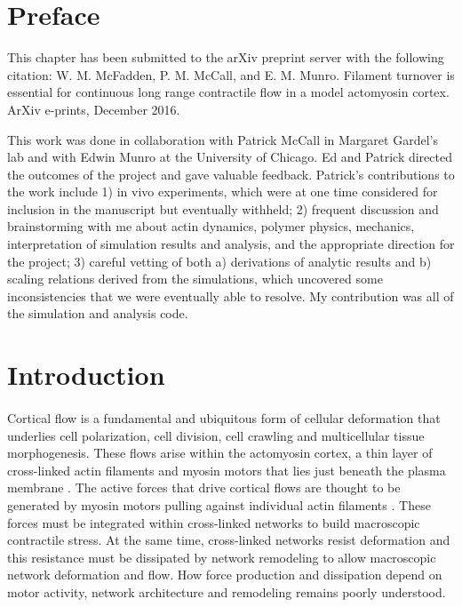 \section{Preface}
This chapter has been submitted to the arXiv preprint server with the following citation: W. M. McFadden, P. M. McCall, and E. M. Munro. Filament turnover is essential for continuous long range contractile flow in a model actomyosin cortex. ArXiv e-prints, December 2016. \cite{2016arXiv161207430M}


This work was done in collaboration with Patrick McCall in Margaret Gardel's lab and with Edwin Munro at the University of Chicago.  Ed and Patrick directed the outcomes of the project and gave valuable feedback.  Patrick's contributions to the work include 1) in vivo experiments, which were at one time considered for inclusion in the manuscript but eventually withheld; 2) frequent discussion and brainstorming with me about actin dynamics, polymer physics, mechanics, interpretation of simulation results and analysis, and the appropriate direction for the project; 3) careful vetting of both a) derivations of analytic results and b) scaling relations derived from the simulations, which uncovered some inconsistencies that we were eventually able to resolve. My contribution was all of the simulation and analysis code.


\section{Introduction}

\paragraph{}  Cortical flow is a fundamental and ubiquitous form of cellular deformation that underlies cell polarization, cell division, cell crawling and multicellular tissue morphogenesis\cite{cellmech_flows3,cellmech_flows2}.  These flows arise within the actomyosin cortex, a thin layer of cross-linked actin filaments and myosin motors that lies just beneath the plasma membrane \cite{Salbreux2012536}. The active forces that drive cortical flows are thought to be generated by myosin motors pulling against individual actin filaments \cite{Munro2004413}. These forces must be integrated within cross-linked networks to build macroscopic contractile stress.  At the same time, cross-linked networks resist deformation and this resistance must be dissipated by network remodeling to allow macroscopic network deformation and flow.  How force production and dissipation depend on motor activity, network architecture and remodeling remains poorly understood.

